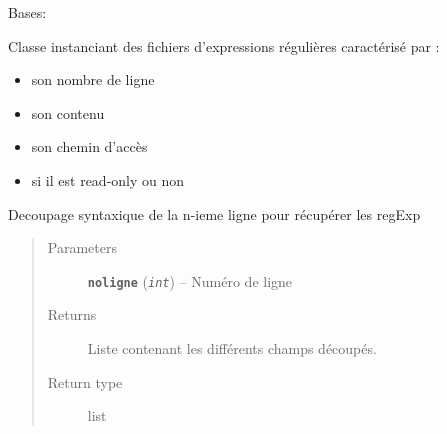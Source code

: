 \documentclass[letterpaper,10pt,english]{sphinxmanual}
\begin{document}
\begin{fulllineitems}
\label{loganalyser:loganalyser.fichier.FichierRegExp}
Bases: {\hyperref[loganalyser:loganalyser.fichier.Fichier]{\emph{}}}

Classe instanciant des fichiers d'expressions régulières caractérisé par :
\begin{itemize}
\item {} 
son nombre de ligne

\item {} 
son contenu

\item {} 
son chemin d'accès

\item {} 
si il est read-only ou non

\end{itemize}

\begin{fulllineitems}
\label{loganalyser:loganalyser.fichier.FichierRegExp.decouperligne}
Decoupage syntaxique de la n-ieme ligne pour récupérer les regExp
\begin{quote}\begin{description}
\item[{Parameters}] \leavevmode
\textbf{\texttt{noligne}} (\emph{\texttt{int}}) -- Numéro de ligne

\item[{Returns}] \leavevmode
Liste contenant les différents champs découpés.

\item[{Return type}] \leavevmode
list

\end{description}\end{quote}

\end{fulllineitems}


\end{fulllineitems}

\end{document}
